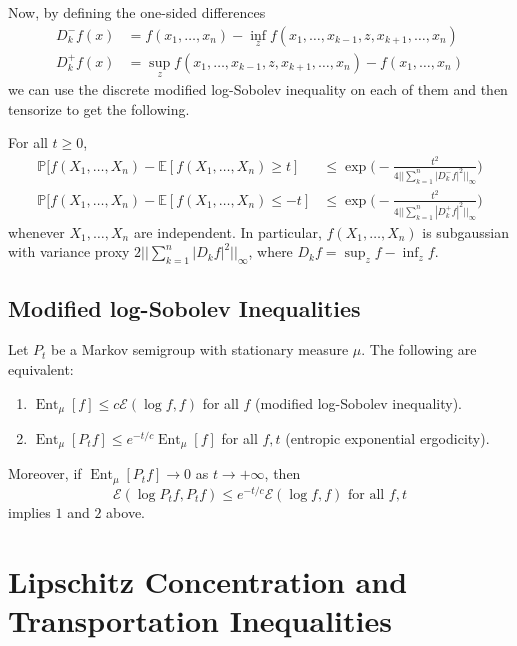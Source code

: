 \documentclass{article}
\DeclareMathOperator{\Ent}{Ent}
\begin{document}
Now, by defining the one-sided differences 
\begin{align*}
    D_k^- f (x) & = f(x_1, \ldots, x_n) - \inf_z f (x_1, \ldots, x_{k-1}, z, x_{k+1}, \ldots, x_n) \\
    D_k^+ f (x) & = \sup_z f (x_1, \ldots, x_{k-1}, z, x_{k+1}, \ldots, x_n) - f(x_1, \ldots, x_n) 
\end{align*}
we can use the discrete modified log-Sobolev inequality on each of them and then tensorize to get the following. 

\begin{theorem}
For all $t \geq 0$, 
\begin{align*}
    \mathbb{P}[ f(X_1, \ldots, X_n) - \mathbb{E}[f(X_1, \ldots, X_n) \geq t] & \leq \exp \bigg( -\frac{t^2}{4 || \sum_{k=1}^n |D_k^- f|^2||_\infty} \bigg) \\
    \mathbb{P}[ f(X_1, \ldots, X_n) - \mathbb{E}[f(X_1, \ldots, X_n) \leq -t] & \leq \exp \bigg( -\frac{t^2}{4 || \sum_{k=1}^n |D_k^+ f|^2||_\infty} \bigg) 
\end{align*}
whenever $X_1, \ldots, X_n$ are independent. In particular, $f(X_1, \ldots, X_n)$ is subgaussian with variance proxy $2 ||\sum_{k=1}^n |D_k f|^2 ||_\infty$, where $D_k f = \sup_z f - \inf_z f$. 
\end{theorem}

\subsection{Modified log-Sobolev Inequalities}

\begin{theorem}
Let $P_t$ be a Markov semigroup with stationary measure $\mu$. The following are equivalent: 
\begin{enumerate}
    \item $\Ent_\mu [f] \leq c \mathcal{E}(\log f, f)$ for all $f$ (modified log-Sobolev inequality). 
    \item $\Ent_\mu [P_t f] \leq e^{-t/c} \Ent_\mu [f]$ for all $f, t$ (entropic exponential ergodicity). 
\end{enumerate}
Moreover, if $\Ent_\mu [P_t f] \rightarrow 0$ as $t \rightarrow +\infty$, then 
\[\mathcal{E}(\log P_t f, P_t f) \leq e^{-t/c} \mathcal{E}(\log f, f) \text{ for all } f, t\]
implies $1$ and $2$ above. 
\end{theorem}


\section{Lipschitz Concentration and Transportation Inequalities}
\end{document}
